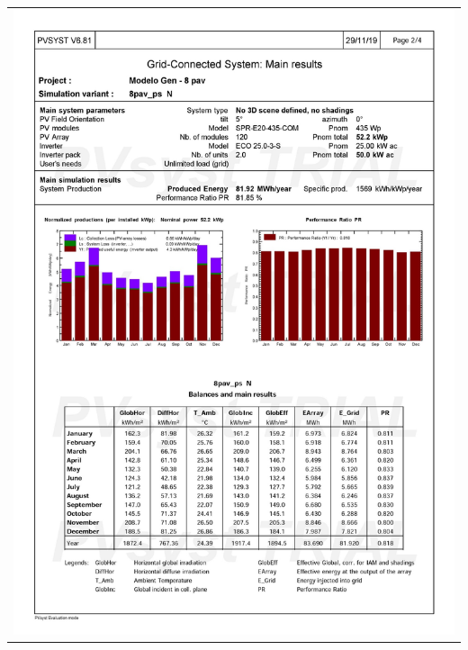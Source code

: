 \begin{table}[H]
    \centering
    \begin{tabular}{l}
        \includegraphics[width=\textwidth]{figures/attachments/resultpv18.jpg}
    \end{tabular}
\end{table}
\pagebreak
